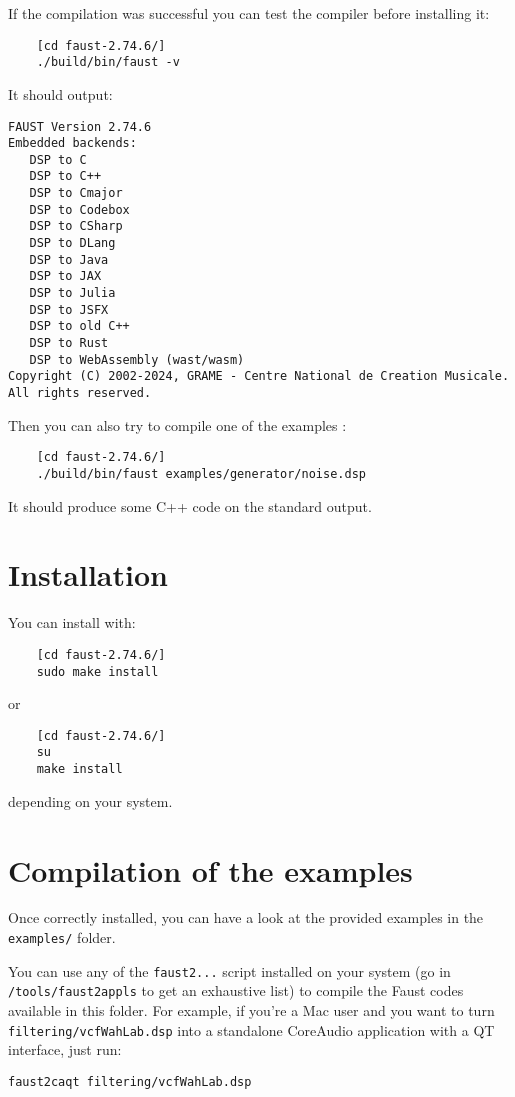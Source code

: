 If the compilation was successful you can test the compiler before installing it:
\begin{lstlisting}
	[cd faust-2.74.6/]
	./build/bin/faust -v
\end{lstlisting}
It should output:
\begin{lstlisting}
FAUST Version 2.74.6
Embedded backends: 
   DSP to C
   DSP to C++
   DSP to Cmajor
   DSP to Codebox
   DSP to CSharp
   DSP to DLang
   DSP to Java
   DSP to JAX
   DSP to Julia
   DSP to JSFX
   DSP to old C++
   DSP to Rust
   DSP to WebAssembly (wast/wasm)
Copyright (C) 2002-2024, GRAME - Centre National de Creation Musicale. All rights reserved. 
\end{lstlisting}

Then you can also try to compile one of the examples :
\begin{lstlisting}
	[cd faust-2.74.6/]
	./build/bin/faust examples/generator/noise.dsp
\end{lstlisting}
It should produce some C++ code on the standard output.

\section{Installation}
You can install \faust with:
\begin{lstlisting}
	[cd faust-2.74.6/]
	sudo make install
\end{lstlisting}
or
\begin{lstlisting}
	[cd faust-2.74.6/]
	su
	make install
\end{lstlisting}
depending on your system.

\section{Compilation of the examples}

Once \faust correctly installed, you can have a look at the provided examples in the \lstinline'examples/' folder. 

You can use any of the \lstinline'faust2...' script installed on your system (go in \lstinline'/tools/faust2appls' to get an exhaustive list) to compile the Faust codes available in this folder. For example, if you're a Mac user and you want to turn \lstinline'filtering/vcfWahLab.dsp' into a standalone CoreAudio application with a QT interface, just run:

\lstinline'faust2caqt filtering/vcfWahLab.dsp'

